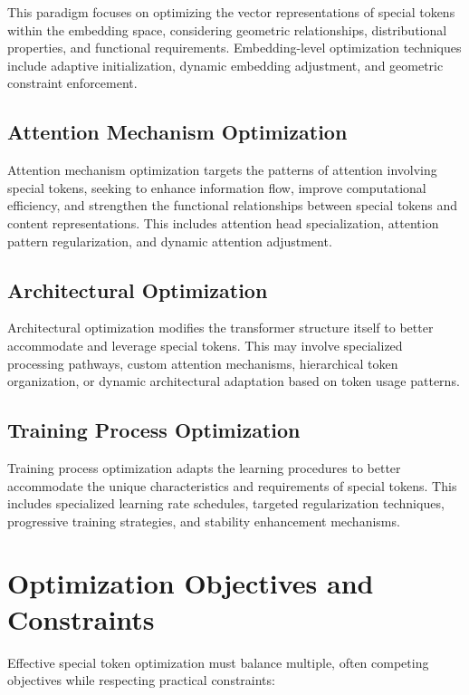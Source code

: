 This paradigm focuses on optimizing the vector representations of special tokens within the embedding space, considering geometric relationships, distributional properties, and functional requirements. Embedding-level optimization techniques include adaptive initialization, dynamic embedding adjustment, and geometric constraint enforcement.

\subsection{Attention Mechanism Optimization}

Attention mechanism optimization targets the patterns of attention involving special tokens, seeking to enhance information flow, improve computational efficiency, and strengthen the functional relationships between special tokens and content representations. This includes attention head specialization, attention pattern regularization, and dynamic attention adjustment.

\subsection{Architectural Optimization}

Architectural optimization modifies the transformer structure itself to better accommodate and leverage special tokens. This may involve specialized processing pathways, custom attention mechanisms, hierarchical token organization, or dynamic architectural adaptation based on token usage patterns.

\subsection{Training Process Optimization}

Training process optimization adapts the learning procedures to better accommodate the unique characteristics and requirements of special tokens. This includes specialized learning rate schedules, targeted regularization techniques, progressive training strategies, and stability enhancement mechanisms.

\section{Optimization Objectives and Constraints}

Effective special token optimization must balance multiple, often competing objectives while respecting practical constraints:


